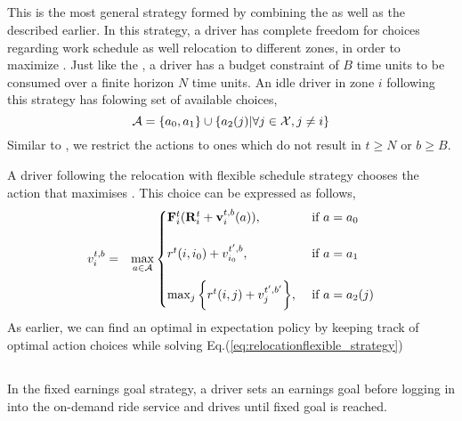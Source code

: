 \subsection{\relocationflexible}

This is the most general strategy formed by combining the {\relocation} as well as the {\flexible} described earlier. In this strategy, a driver has complete freedom for choices regarding work schedule as well relocation to different zones, in order to maximize {\totalexpectedearnings}. Just like the {\flexible}, a driver has a budget constraint of $B$ time units to be consumed over a finite horizon $N$ time units. An idle driver in zone $i$ following this strategy has folowing set of available choices,
\begin{equation}
\mathcal{A} =  \{a_0, a_1\} \cup \{a_2(j) | \forall j \in \mathcal{X}, j \neq i \}
\end{equation}
Similar to {\relocation}, we restrict the {\relocate} actions to ones which do not result in $t \geq N$ or $b \geq B$.

A driver following the relocation with flexible schedule strategy chooses the action that maximises {\totalexpectedearnings}. This choice can be expressed as follows,
\begin{eqnarray}
\label{eq:relocationflexible_strategy}
v_{i}^{t,b} &=& \max_{a \in \mathcal{A}}
    \begin{cases}
    {\ensuremath{\mathbf{F}}}_{i}^{t} ({\mathbf{R}}_{i}^{t} +  \mathbf{v}_{i}^{t,b}({a})), &\textrm{  if } a = a_0\\ \\
    r^t(i,{i_0}) + v_{{i_0}}^{t',b}, &\textrm{  if } a = a_1 \\ \\
    \max_{j} \bigg\{r^t(i,j) + v_{j}^{t',b'}\bigg\}, &\textrm{  if } a = a_2(j)
    \end{cases}
\end{eqnarray}
As earlier, we can find an optimal in expectation policy by keeping track of optimal action choices while solving Eq.(\ref{eq:relocationflexible_strategy})

\subsection{\earningsgoal}
In the fixed earnings goal strategy, a driver sets an earnings goal before logging in into the on-demand ride service and drives until fixed goal is reached.
